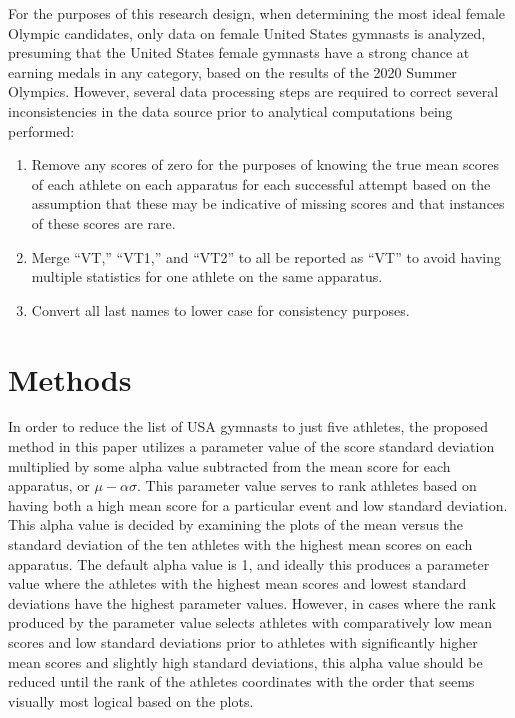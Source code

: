 \documentclass[12pt]{article}
\begin{document}
For the purposes of this research design, when determining the most ideal female Olympic candidates, 
only data on female United States gymnasts is analyzed, presuming that the United States 
female gymnasts have a strong chance at earning medals in any category, based on the results of the 2020 Summer Olympics. 
However, several data processing steps are required to correct several inconsistencies in the data source prior to 
analytical computations being performed:

\begin{enumerate}
\item Remove any scores of zero for the purposes of knowing the true mean scores of each athlete on each 
apparatus for each successful attempt based on the assumption that these may 
be indicative of missing scores and that instances of these scores are rare.
\item Merge ``VT,'' ``VT1,'' and ``VT2'' to all be reported as ``VT'' to avoid having 
multiple statistics for one athlete on the same apparatus.
\item Convert all last names to lower case for consistency purposes.
\end{enumerate}


\section{Methods}
\label{sec:meth}

In order to reduce the list of USA gymnasts to just five athletes, the proposed method in 
this paper utilizes a parameter value of the score standard deviation multiplied by some alpha value subtracted 
from the mean score for each apparatus, or $\mu - \alpha \sigma$. This parameter value serves to rank athletes based 
on having both a high mean score for a particular event and low standard deviation. 
This alpha value is decided by examining the plots of the mean versus the standard deviation of the ten athletes 
with the highest mean scores on each apparatus. The default alpha value is 1, and ideally this produces a parameter 
value where the athletes with the highest mean scores and lowest standard deviations have the highest parameter values. 
However, in cases where the rank produced by the parameter value selects athletes with comparatively low mean scores and 
low standard deviations prior to athletes with significantly higher mean scores and slightly high standard deviations, 
this alpha value should be reduced until the rank of the athletes coordinates with the order that seems visually most 
logical based on the plots. 
\end{document}
